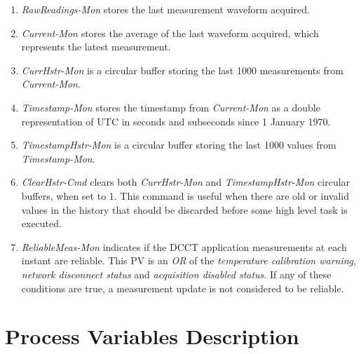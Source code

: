 \documentclass[openany]{article}
\begin{document}
		\begin{enumerate}
			\item \emph{RawReadings-Mon} stores the last measurement waveform acquired.
			\item \emph{Current-Mon} stores the average of the last waveform acquired, which represents the latest measurement.
			\item \emph{CurrHstr-Mon} is a circular buffer storing the last 1000 measurements from \emph{Current-Mon}.
			\item \emph{Timestamp-Mon} stores the timestamp from \emph{Current-Mon} as a double representation of UTC in seconds and subseconds since 1 January 1970.
			\item \emph{TimestampHstr-Mon} is a circular buffer storing the last 1000 values from \emph{Timestamp-Mon}.
			\item \emph{ClearHstr-Cmd} clears both \emph{CurrHstr-Mon} and \emph{TimestampHstr-Mon} circular buffers, when set to 1. This command is useful when there are old or invalid values in the history that should be discarded before some high level task is executed.
			\item \emph{ReliableMeas-Mon} indicates if the DCCT application measurements at each instant are reliable. This PV is an \emph{OR} of the \emph{temperature calibration warning}, \emph{network disconnect status} and \emph{acquisition disabled status}. If any of these conditions are true, a measurement update is not considered to be reliable.
		\end{enumerate}

\newpage
\section{Process Variables Description}\label{sec:process-variables}
\end{document}
